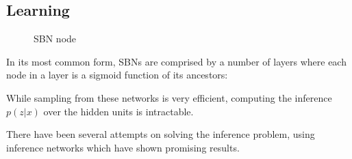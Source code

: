 \newpage
\subsection{Learning}
\begin{figure}[htb]
\centering

  \caption{SBN node}
  \label{fig:sbn_node}
\end{figure}


In its most common form, SBNs are comprised by a number of layers where each node in a layer is a sigmoid function of its ancestors:

While sampling from these networks is very efficient, computing the inference $p(z|x)$ over the hidden units is intractable.

There have been several attempts on solving the inference problem, using inference networks which have shown promising results.

\newpage
